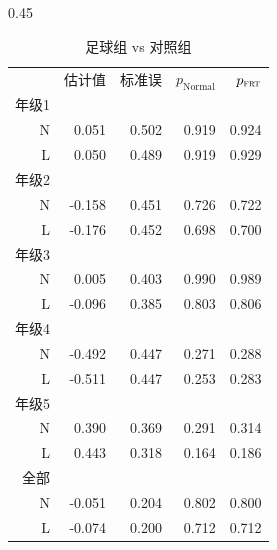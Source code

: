 \begin{table}
\centering
\caption{基于\citet{chong2016iron}数据的再分析：“\textsc{N}”表示\citet{Neyman:1923}的不调整协变量估计与检验，“\textsc{L}”表示\citet{lin2013}的协变量调整估计与检验。}\label{tb::pv-values-chong}
\begin{subtable}[h]{0.45\textwidth}
\caption{足球组 vs 对照组}
    \begin{tabular}{rrrrr}
    \hline 
   &    估计值 & 标准误 &$p_\text{Normal}$ & $p_{\textsc{frt}}$ \\
       年级1& &&&\\
\textsc{N}  &  0.051 &0.502 &     0.919  & 0.924 \\
\textsc{L}   &    0.050 & 0.489 &     0.919 &  0.929 \\
       年级2& &&&\\
\textsc{N}  &  -0.158 &0.451  &    0.726  & 0.722\\
\textsc{L}   &  -0.176 & 0.452   &   0.698  & 0.700 \\
       年级3& &&&\\
\textsc{N}  &  0.005 &0.403  &    0.990 &  0.989 \\
\textsc{L}   &   -0.096& 0.385 &     0.803&   0.806 \\
       年级4& &&&\\
\textsc{N}  &  -0.492& 0.447  &    0.271 &  0.288 \\
\textsc{L}   &    -0.511& 0.447  &    0.253 &  0.283 \\
       年级5& &&&\\
\textsc{N}  &  0.390& 0.369 &     0.291 &  0.314 \\
\textsc{L}   &   0.443 &0.318  &    0.164  & 0.186 \\
       全部& &&&\\
\textsc{N}  &  -0.051 & 0.204  &    0.802 &  0.800 \\
\textsc{L}   &    -0.074& 0.200   &   0.712  & 0.712\\
\hline 
    \end{tabular}
\end{subtable}


\end{table}
